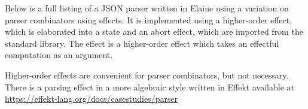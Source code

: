 Below is a full listing of a JSON parser written in Elaine using a variation on parser combinators using effects. It is implemented using a higher-order  effect, which is elaborated into a state and an abort effect, which are imported from the standard library. The  effect is a higher-order effect which takes an effectful computation as an argument.

Higher-order effects are convenient for parser combinators, but not necessary. There is a parsing effect in a more algebraic style written in Effekt available at \url{https://effekt-lang.org/docs/casestudies/parser} 

